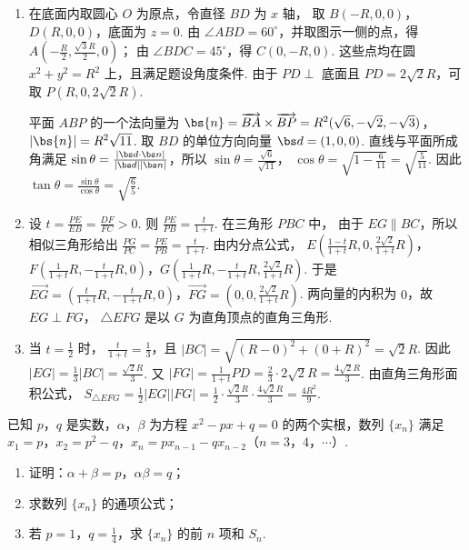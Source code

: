 \begin{solution}
\begin{enumerate}
\item 在底面内取圆心 \(O\) 为原点，令直径 \(BD\) 为 \(x\) 轴，
取 \(B(-R,0,0)\)，\(D(R,0,0)\)，底面为 \(z=0\).
由 \(\angle ABD=60^\circ\)，并取图示一侧的点，得
\(A\left(-\frac R2,\frac{\sqrt3R}{2},0\right)\)；
由 \(\angle BDC=45^\circ\)，得 \(C(0,-R,0)\).
这些点均在圆 \(x^2+y^2=R^2\) 上，且满足题设角度条件.
由于 \(PD\perp\) 底面且 \(PD=2\sqrt2R\)，可取
\(P(R,0,2\sqrt2R)\).

平面 \(ABP\) 的一个法向量为
\(\bs{n}=\overrightarrow{BA}\times\overrightarrow{BP} =R^2(\sqrt6,-\sqrt2,-\sqrt3)\)，\(|\bs{n}|=R^2\sqrt{11}\).
取 \(BD\) 的单位方向向量 \(\bs d=(1,0,0)\). 直线与平面所成角满足
\(\sin\theta=\frac{|\bs d\cdot\bs n|}{|\bs d||\bs n|}\)，所以
\(\sin\theta=\frac{\sqrt6}{\sqrt{11}}\)，
\(\cos\theta=\sqrt{1-\frac6{11}}=\sqrt{\frac5{11}}\).
因此 \(\tan\theta=\frac{\sin\theta}{\cos\theta}=\sqrt{\frac65}\).

\item 设 \(t=\frac{PE}{EB}=\frac{DF}{FC}>0\). 则
\(\frac{PE}{PB}=\frac{t}{1+t}\). 在三角形 \(PBC\) 中，
由于 \(EG\parallel BC\)，所以相似三角形给出
\(\frac{PG}{PC}=\frac{PE}{PB}=\frac{t}{1+t}\).
由内分点公式，
\(E\left(\frac{1-t}{1+t}R,0,\frac{2\sqrt2}{1+t}R\right)\)，\(F\left(\frac1{1+t}R,-\frac{t}{1+t}R,0\right)\)，\(G\left(\frac1{1+t}R,-\frac{t}{1+t}R,\frac{2\sqrt2}{1+t}R\right)\).
于是
\(\overrightarrow{EG}=\left(\frac{t}{1+t}R,-\frac{t}{1+t}R,0\right)\)，\(\overrightarrow{FG}=\left(0,0,\frac{2\sqrt2}{1+t}R\right)\).
两向量的内积为 \(0\)，故 \(EG\perp FG\)，
\(\triangle EFG\) 是以 \(G\) 为直角顶点的直角三角形.

\item 当 \(t=\frac12\) 时，
\(\frac{t}{1+t}=\frac13\)，且
\(|BC|=\sqrt{(R-0)^2+(0+R)^2}=\sqrt2R\).
因此 \(|EG|=\frac13|BC|=\frac{\sqrt2R}{3}\).
又 \(|FG|=\frac1{1+t}PD=\frac23\cdot2\sqrt2R=\frac{4\sqrt2R}{3}\).
由直角三角形面积公式，
\(S_{\triangle EFG}=\frac12|EG||FG|
=\frac12\cdot\frac{\sqrt2R}{3}\cdot\frac{4\sqrt2R}{3}
=\frac{4R^2}{9}\).
\end{enumerate}
\end{solution}

\begin{problem}
已知 \(p\)，\(q\) 是实数，\(\alpha\)，\(\beta\) 为方程 \(x^2 - px + q = 0\) 的两个实根，数列 \(\{x_n\}\) 满足 \(x_1 = p\)，\(x_2 = p^2 - q\)，\(x_n = px_{n-1} - qx_{n-2}\)（\(n = 3\)，\(4\)，\(\cdots\)）.

\begin{enumerate}
\item 证明：\(\alpha + \beta = p\)，\(\alpha \beta = q\)；
\item 求数列 \(\{x_n\}\) 的通项公式；
\item 若 \(p = 1\)，\(q = \frac{1}{4}\)，求 \(\{x_n\}\) 的前 \(n\) 项和 \(S_n\).
\end{enumerate}
\end{problem}

